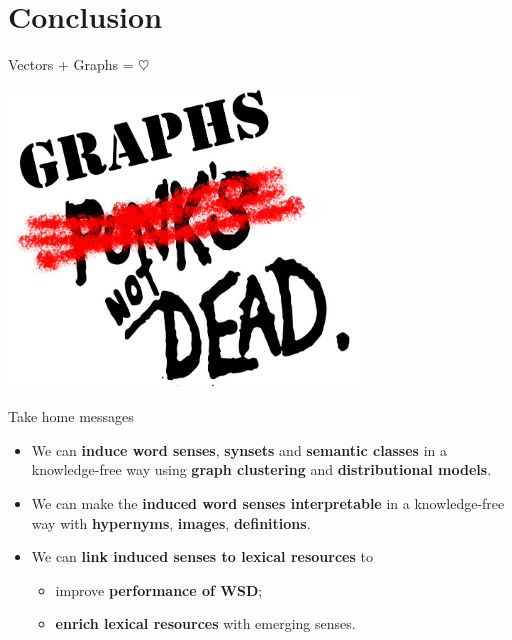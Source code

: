 
\section{Conclusion}


\begin{frame}{Vectors + Graphs = $\heartsuit$ }

\begin{center}
\includegraphics[width=0.7\textwidth]{figures/graphs}	
\end{center}

\end{frame}

\begin{frame}{Take home messages}

\begin{itemize}
	\item We can \alert{\textbf{induce word senses}}, \alert{\textbf{synsets}} and \alert{\textbf{semantic classes}} in a knowledge-free way using \textbf{graph clustering} and \textbf{distributional models}.
    \vspace{1em}
    \pause
    
	\item We can make the \alert{\textbf{induced word senses interpretable}} in a knowledge-free way with \textbf{hypernyms}, \textbf{images},  \textbf{definitions}. 
	\vspace{1em}
    \pause
	
	\item We can \alert{\textbf{link induced senses to lexical resources}} to
	\begin{itemize} 
		\item improve \textbf{performance of WSD};
		\item \textbf{enrich lexical resources} with emerging senses.
	\end{itemize}
	
\end{itemize}


\end{frame}


